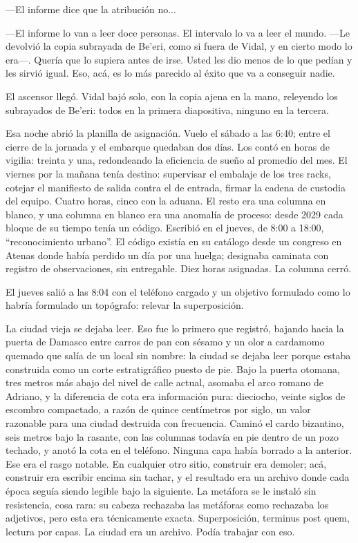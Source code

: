---El informe dice que la atribución no...

---El informe lo van a leer doce personas. El intervalo lo va a leer el mundo. ---Le devolvió la copia subrayada de Be'eri, como si fuera de Vidal, y en cierto modo lo era---. Quería que lo supiera antes de irse. Usted les dio menos de lo que pedían y les sirvió igual. Eso, acá, es lo más parecido al éxito que va a conseguir nadie.

El ascensor llegó. Vidal bajó solo, con la copia ajena en la mano, releyendo los subrayados de Be'eri: todos en la primera diapositiva, ninguno en la tercera.


\scenebreak


Esa noche abrió la planilla de asignación. Vuelo el sábado a las 6:40; entre el cierre de la jornada y el embarque quedaban dos días. Los contó en horas de vigilia: treinta y una, redondeando la eficiencia de sueño al promedio del mes. El viernes por la mañana tenía destino: supervisar el embalaje de los tres racks, cotejar el manifiesto de salida contra el de entrada, firmar la cadena de custodia del equipo. Cuatro horas, cinco con la aduana. El resto era una columna en blanco, y una columna en blanco era una anomalía de proceso: desde 2029 cada bloque de su tiempo tenía un código. Escribió en el jueves, de 8:00 a 18:00, ``reconocimiento urbano''. El código existía en su catálogo desde un congreso en Atenas donde había perdido un día por una huelga; designaba caminata con registro de observaciones, sin entregable. Diez horas asignadas. La columna cerró.

El jueves salió a las 8:04 con el teléfono cargado y un objetivo formulado como lo habría formulado un topógrafo: relevar la superposición.

La ciudad vieja se dejaba leer. Eso fue lo primero que registró, bajando hacia la puerta de Damasco entre carros de pan con sésamo y un olor a cardamomo quemado que salía de un local sin nombre: la ciudad se dejaba leer porque estaba construida como un corte estratigráfico puesto de pie. Bajo la puerta otomana, tres metros más abajo del nivel de calle actual, asomaba el arco romano de Adriano, y la diferencia de cota era información pura: dieciocho, veinte siglos de escombro compactado, a razón de quince centímetros por siglo, un valor razonable para una ciudad destruida con frecuencia. Caminó el cardo bizantino, seis metros bajo la rasante, con las columnas todavía en pie dentro de un pozo techado, y anotó la cota en el teléfono. Ninguna capa había borrado a la anterior. Ese era el rasgo notable. En cualquier otro sitio, construir era demoler; acá, construir era escribir encima sin tachar, y el resultado era un archivo donde cada época seguía siendo legible bajo la siguiente. La metáfora se le instaló sin resistencia, cosa rara: su cabeza rechazaba las metáforas como rechazaba los adjetivos, pero esta era técnicamente exacta. Superposición, terminus post quem, lectura por capas. La ciudad era un archivo. Podía trabajar con eso.

